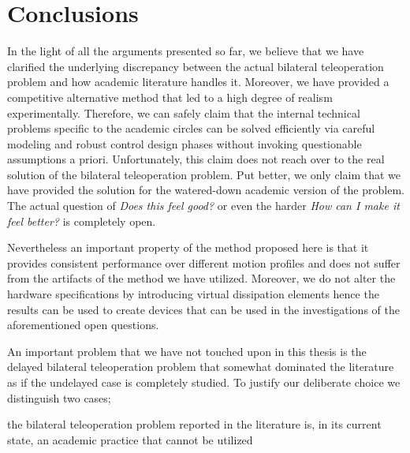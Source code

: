 \chapter{Conclusions}
\label{chap:conc}

In the light of all the arguments presented so far, we believe that we have clarified the underlying discrepancy between the actual bilateral 
teleoperation problem and how academic literature handles it. Moreover, we have provided a competitive alternative method that led to a high
degree of realism experimentally. Therefore, we can safely claim that the internal technical problems specific to the academic circles can 
be solved efficiently via careful modeling and robust control design phases without invoking questionable assumptions a priori. Unfortunately, 
this claim does not reach over to the real solution of the bilateral teleoperation problem. Put better, we only claim that we have provided
the solution for the watered-down academic version of the problem. The actual question of \emph{Does this feel good?} or even the harder 
\emph{How can I make it feel better?} is completely open. 

Nevertheless an important property of the method proposed here is that it provides consistent performance over different motion profiles and 
does not suffer from the artifacts of the method we have utilized. Moreover, we do not alter the hardware specifications by introducing 
virtual dissipation elements hence the results can be used to create devices that can be used in the investigations of the aforementioned 
open questions.  

An important problem that we have not touched upon in this thesis is the delayed bilateral teleoperation problem that somewhat dominated the
literature as if the undelayed case is completely studied. To justify our deliberate choice we distinguish two cases; 







the bilateral teleoperation problem reported in the literature is, 
in its current state, an academic practice that cannot be utilized 
